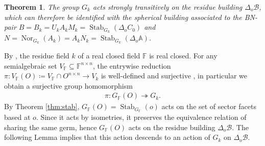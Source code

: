 \documentclass[12pt]{amsart}
\newcommand{\F}{\mathbb{F} }
\newcommand{\B}{\mathcal{B}}
\numberwithin{equation}{section}
\newtheorem{theorem}{Theorem}[section]
\newtheorem{proposition}[theorem]{Proposition}
\theoremstyle{remark} %
\begin{document}
\begin{theorem}\label{thm:germ_building}
	The group $G_k$ acts strongly transitively on the residue building $\Delta_o\B$, which can therefore be identified with the spherical building associated to the BN-pair $B=B_k = U_kA_kM_k =  \operatorname{Stab}_{G_k}(\Delta_oC_0)$ and $N=\operatorname{Nor}_{G_k}(A_k) = A_kN_k = \operatorname{Stab}_{G_k}(\Delta_o \mathbb{A})$.
\end{theorem}
By \cite[Theorem 4.3.7]{EnPr05}, the residue field $k$ of a real closed field $\F$ is real closed. %
For any semialgebraic set $V_\F \subseteq \F^{n\times n}$, the entrywise reduction $\pi \colon V_\F(O) \coloneq V_\F \cap O^{n \times n} \to V_k$ is well-defined and surjective \cite[Proposition 2.18]{BIPP23arxiv}, in particular we obtain a surjective group homomorphism
\begin{align*}
\pi \colon	G_\F(O) \twoheadrightarrow G_k.
\end{align*}
By Theorem \ref{thm:stab}, $G_\F(O) = \operatorname{Stab}_{G_\F}(o)$ acts on the set of sector facets based at $o$. Since it acts by isometries, it preserves the equivalence relation of sharing the same germ, hence $G_\F(O)$ acts on the residue building $\Delta_o\B$. The following Lemma implies that this action descends to an action of $G_k$ on $\Delta_o \B$.
\end{document}
